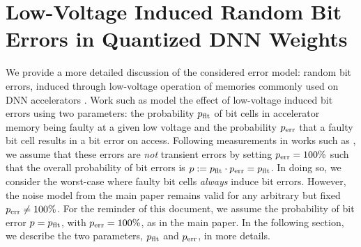     \section{Low-Voltage Induced Random Bit Errors in Quantized DNN Weights}
\label{sec:supp-main}

We provide a more detailed discussion of the considered error model: random bit errors, induced through low-voltage operation of memories commonly used on DNN accelerators \cite{KimDATE2018,KoppulaMICRO2019}. Work such as \cite{ChandramoorthyHPCA2019,KoppulaMICRO2019} model the effect of low-voltage induced bit errors using two parameters: the probability $\pfault$ of bit cells in accelerator memory being faulty at a given low voltage and the probability $\perror$ that a faulty bit cell results in a bit error on access.
Following measurements in works such as \cite{GanapathyHPCA2019,KimDATE2018}, we assume that these errors are \emph{not} transient errors by setting $\perror = 100\%$ such that the overall probability of bit errors is $p := \pfault \cdot \perror = \pfault$. In doing so, we consider the worst-case where faulty bit cells \emph{always} induce bit errors. However, the noise model from the main paper remains valid for any arbitrary but fixed $\perror \neq 100\%$. For the reminder of this document, we assume the probability of bit error $p = \pfault$, with $\perror = 100\%$, as in the main paper. In the following section, we describe the two parameters, $\pfault$ and $\perror$, in more details.

